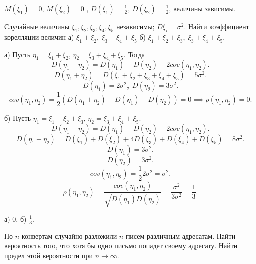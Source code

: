 \begin{result}
$M(\xi_1) = 0$, $M(\xi_2) = 0$ , $D(\xi_1) = \frac{1}{2}$, $D(\xi_2) = \frac{1}{2}$, величины
зависимы. 
\end{result}

\medskip
\begin{task}{11}
  Случайные величины $\xi_1, \xi_2,\xi_3, \xi_4,\xi_5$ независимы; $D\xi_i = \sigma^2$. Найти 
  коэффициент корелляции величин а) $\xi_1 + \xi_2, \; \xi_3+\xi_4+\xi_5$ б) $\xi_1 +\xi_2+\xi_3, \;
  \xi_3 +\xi_4+\xi_5$. 
\end{task}

\begin{subtask}{а)}
  Пусть $\eta_1 = \xi_1 + \xi_2$, $\eta_2 = \xi_3 + \xi_4 + \xi_5$. Тогда \[
  D(\eta_1 + \eta_2) = D(\eta_1) + D(\eta_2) + 2 cov(\eta_1, \eta_2)
  .\] 
  \[
  D(\eta_1 + \eta_2) = D(\xi_1 + \xi_2 + \xi_3 + \xi_4 + \xi_5) = 5 \sigma^2
  .\] 
  \[
  D(\eta_1) = 2 \sigma^2, \; D(\eta_2) = 3 \sigma^2
  .\] 
  \[
  cov(\eta_1, \eta_2) = \frac{1}{2} \left(D(\eta_1 + \eta_2) - D(\eta_1) - D(\eta_2)\right) = 0
  \implies \rho(\eta_1, \eta_2) = 0
  .\] 
\end{subtask}

\begin{subtask}{б)}
Пусть $\eta_1 = \xi_1 + \xi_2 + \xi_3$, $\eta_2 = \xi_3 + \xi_4 + \xi_5$.
\[
D(\eta_1 + \eta_2) = D(\eta_1) + D(\eta_2) + 2 cov(\eta_1, \eta_2)
.\] 
\[
D(\eta_1 + \eta_2) = D(\xi_1) + D(\xi_2) + 4 D(\xi_3) + D(\xi_4) + D(\xi_5) = 8 \sigma^2
.\] 
\[
D(\eta_1) = 3 \sigma^2
.\] 
\[
D(\eta_2) = 3 \sigma^2
.\] 
\[
cov(\eta_1, \eta_2) = \frac{1}{2} 2 \sigma^2 = \sigma^2
.\] 
\[
\rho(\eta_1, \eta_2) = \frac{cov(\eta_1, \eta_2)}{\sqrt{D(\eta_1) D(\eta_2)} } =
\frac{\sigma^2}{3\sigma^2} = \frac{1}{3}
.\] 
\end{subtask}

\begin{result}
а) $0$, б) $\frac{1}{3}$.
\end{result}
\medskip
\begin{task}{16}
  По $n$ конвертам случайно разложили $n$ писем различным адресатам. Найти вероятность того, что
  хотя бы одно письмо попадет своему адресату. Найти предел этой вероятности при $n \to \infty$.
\end{task}

